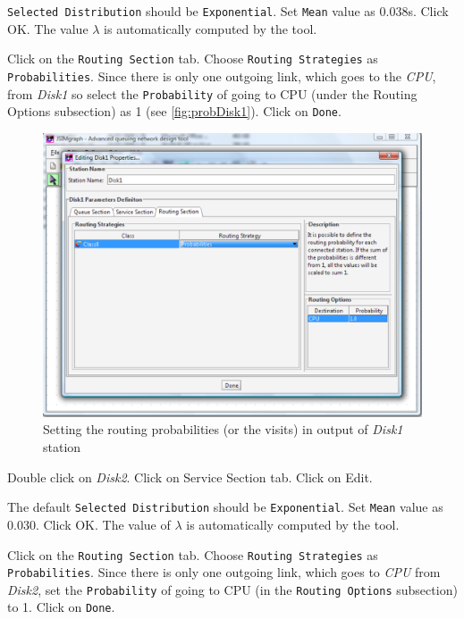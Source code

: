 \begin{itemize*}
\texttt{Selected Distribution} should be \texttt{Exponential}. Set
\texttt{Mean} value as 0.038s. Click OK. The value $\lambda$ is
automatically computed by the tool. \item Click on the
\texttt{Routing Section} tab. Choose \texttt{Routing Strategies}
as \texttt{Probabilities}. Since there is only one outgoing link,
which goes to the \emph{CPU}, from \emph{Disk1} so select the
\texttt{Probability} of going to CPU (under the Routing Options
subsection) as 1 (see \autoref{fig:probDisk1}). Click on
\texttt{Done}.
\begin{figure}[htb]
    \begin{center}
        \includegraphics[scale=.5]{img/jsimg/12.8.eps}
    \end{center}
    \caption{Setting the routing probabilities (or the visits) in output
    of \emph{Disk1} station}
    \label{fig:probDisk1}
\end{figure}
\item Double click on \emph{Disk2}. Click on Service Section tab.
Click on Edit. \item The default \texttt{Selected Distribution}
should be \texttt{Exponential}. Set \texttt{Mean} value as 0.030.
Click OK. The value of $\lambda$ is automatically computed by the
tool. \item Click on the \texttt{Routing Section} tab. Choose
\texttt{Routing Strategies} as \texttt{Probabilities}.  Since
there is only one outgoing link, which goes to \emph{CPU} from
\emph{Disk2}, set the \texttt{Probability} of going to CPU (in the
\texttt{Routing Options} subsection) to 1. Click on \texttt{Done}.
\end{itemize*}

